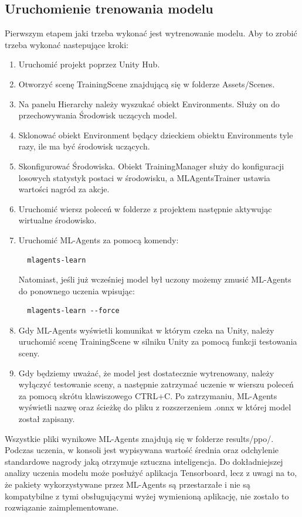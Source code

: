 \documentclass{SGGW-thesis}
\begin{document}
\subsection{Uruchomienie trenowania modelu}
Pierwszym etapem jaki trzeba wykonać jest wytrenowanie modelu. Aby to zrobić trzeba wykonać nastepujące kroki:
\begin{enumerate}
  \item{Uruchomić projekt poprzez Unity Hub}.
  \item{Otworzyć scenę TrainingScene znajdującą się w folderze Assets/Scenes}.
  \item{Na panelu Hierarchy należy wyszukać obiekt Environments. Służy on do przechowywania Środowisk uczących model}.
  \item{Sklonować obiekt Environment będący dzieckiem obiektu Environments tyle razy, ile ma być środowisk uczących}.
  \item{Skonfigurować Środowiska. Obiekt TrainingManager służy do konfiguracji losowych statystyk postaci w środowisku, a MLAgentsTrainer ustawia wartości nagród za akcje}.
  \item{Uruchomić wiersz poleceń w folderze z projektem następnie aktywując wirtualne środowisko}.
  \item{Uruchomić ML-Agents za pomocą komendy:
  \begin{lstlisting}
  mlagents-learn
  \end{lstlisting}
  Natomiast, jeśli już wcześniej model był uczony możemy zmusić ML-Agents do ponownego uczenia wpisując:
  \begin{lstlisting}
  mlagents-learn --force
  \end{lstlisting}}
  \item{Gdy ML-Agents wyświetli komunikat w którym czeka na Unity, należy uruchomić scenę TrainingScene w silniku Unity za pomocą funkcji testowania sceny}.
  \item{Gdy będziemy uważać, że model jest dostatecznie wytrenowany, należy wyłączyć testowanie sceny, a następnie zatrzymać uczenie w wierszu poleceń za pomocą skrótu klawiszowego CTRL+C.
  Po zatrzymaniu, ML-Agents wyświetli nazwę oraz ścieżkę do pliku z rozszerzeniem .onnx w której model został zapisany}.
\end{enumerate}
Wszystkie pliki wynikowe ML-Agents znajdują się w folderze results/ppo/. Podczas uczenia, w konsoli jest wypisywana wartość średnia oraz odchylenie standardowe nagrody jaką otrzymuje sztuczna inteligencja.
Do dokładniejszej analizy uczenia modelu może posłużyć aplikacja Tensorboard, lecz z uwagi na to, że pakiety wykorzystywane przez ML-Agents są przestarzałe i nie są 
kompatybilne z tymi obsługującymi wyżej wymienioną aplikację, nie zostało to rozwiązanie zaimplementowane.
\pagebreak
\end{document}
